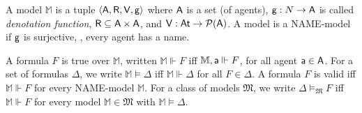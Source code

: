 A model $\mathbb{M}$ is a tuple $\langle \mathsf{A},\mathsf{R},\mathsf{V},\mathsf{g}\rangle$ where $\mathsf{A}$
is a set (of agents), $\mathsf{g}:N\rightarrow \mathsf{A}$ is called \emph{denotation
function}, $\mathsf{R}\subseteq \mathsf{A}\times \mathsf{A}$, and $\mathsf{V}:\mathsf{At}\rightarrow
\mathcal{P}(\mathsf{A})$. 
%
A model is a NAME-model if $\mathsf{g}$ is surjective, \ie, every agent has a name.  

A formula $F$ is true over $\mathbb{M}$, written $\mathbb{M}\Vdash F$ iff
$\mathbb{M},\mathsf{a}\Vdash F$, for all agent $\mathsf{a}\in\mathsf{A}$. For a set of formulas
$\Delta$, we write $\mathbb{M}\models \Delta$ iff $\mathbb{M}\Vdash \Delta$ for all $F
\in \Delta$. A formula $F$ is valid iff $\mathbb{M}\Vdash F$ for every
NAME-model $\mathbb{M}$. For a class of models $\mathfrak{M}$, we write
$\Delta\models_{\mathfrak{M}} F$ iff $\mathbb{M}\Vdash F$ for every model
$\mathbb{M}\in \mathfrak{M}$ with $\mathbb{M}\models \Delta$. 
